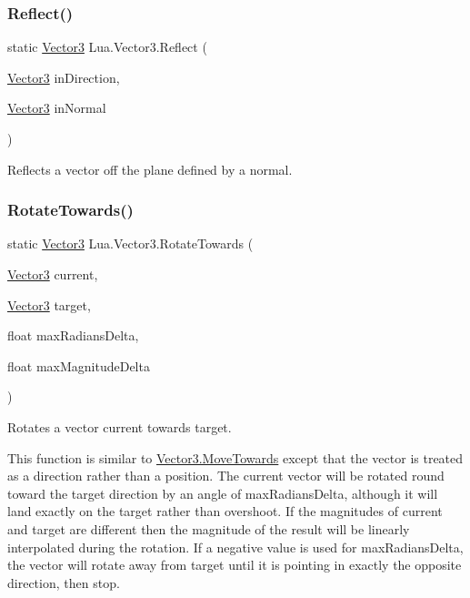 \subsubsection{\texorpdfstring{Reflect()}{Reflect()}}
{\footnotesize\ttfamily static \mbox{\hyperlink{class_lua_1_1_vector3}{Vector3}} Lua.\+Vector3.\+Reflect (\begin{DoxyParamCaption}\item[{\mbox{\hyperlink{class_lua_1_1_vector3}{Vector3}}}]{in\+Direction,  }\item[{\mbox{\hyperlink{class_lua_1_1_vector3}{Vector3}}}]{in\+Normal }\end{DoxyParamCaption})\hspace{0.3cm}{\ttfamily [static]}}



Reflects a vector off the plane defined by a normal. 

\mbox{\label{class_lua_1_1_vector3_a938bc42ace148202da5445f245581927}} 
\subsubsection{\texorpdfstring{RotateTowards()}{RotateTowards()}}
{\footnotesize\ttfamily static \mbox{\hyperlink{class_lua_1_1_vector3}{Vector3}} Lua.\+Vector3.\+Rotate\+Towards (\begin{DoxyParamCaption}\item[{\mbox{\hyperlink{class_lua_1_1_vector3}{Vector3}}}]{current,  }\item[{\mbox{\hyperlink{class_lua_1_1_vector3}{Vector3}}}]{target,  }\item[{float}]{max\+Radians\+Delta,  }\item[{float}]{max\+Magnitude\+Delta }\end{DoxyParamCaption})\hspace{0.3cm}{\ttfamily [static]}}



Rotates a vector current towards target. 

This function is similar to \mbox{\hyperlink{class_lua_1_1_vector3_aa4b2a5ff6af794cc8a83617227bee73b}{Vector3.\+Move\+Towards}} except that the vector is treated as a direction rather than a position. The {\ttfamily current} vector will be rotated round toward the target direction by an angle of {\ttfamily max\+Radians\+Delta}, although it will land exactly on the target rather than overshoot. If the magnitudes of {\ttfamily current} and {\ttfamily target} are different then the magnitude of the result will be linearly interpolated during the rotation. If a negative value is used for {\ttfamily max\+Radians\+Delta}, the vector will rotate away from {\ttfamily target} until it is pointing in exactly the opposite direction, then stop.

